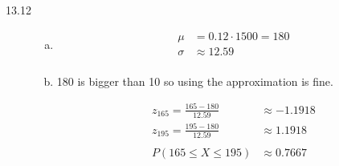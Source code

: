 \documentclass[letterpaper, landscape]{exam}
\begin{document}
\begin{description}
\begin{enumerate}[(a)]
      \end{enumerate}

    \item[13.12]
      \begin{enumerate}[(a)]
        \item 
          \begin{align*}
            \mu    & = 0.12 \cdot 1500 = 180 \\
            \sigma & \approx 12.59 \\
          \end{align*}

        \item
          180 is bigger than 10 so using the approximation is fine.

          \begin{align*}
            z_{165} = \frac{165 - 180}{12.59} & \approx -1.1918 \\
            z_{195} = \frac{195 - 180}{12.59} & \approx 1.1918 \\
            \\
            P(165 \leq X \leq 195)            & \approx 0.7667 \\
          \end{align*}

      \end{enumerate}


  \end{description}
\end{document}

